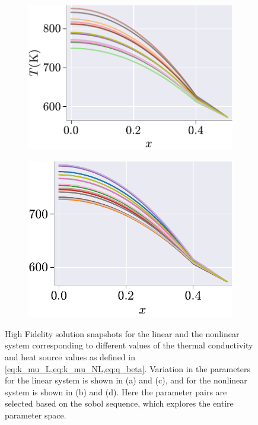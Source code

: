 \documentclass[11pt]{article}
\begin{document}
\begin{figure}[t]
        \begin{subfigure}[b]{0.45\linewidth}
            \centering
            \includegraphics[width=\linewidth]{linear_T_FOM.pdf}
            \caption{}
            \label{fig:HFS_HC_c}
        \end{subfigure}
        \begin{subfigure}[b]{0.45\linewidth}
            \centering
            \includegraphics[width=0.92\linewidth]{nonlinear_T_FOM.pdf}
            \caption{}
            \label{fig:HFS_HC_d}
        \end{subfigure}
        \caption{High Fidelity solution snapshots for the linear and the nonlinear system corresponding to different values of the thermal conductivity and heat source values as defined in \cref{eq:k_mu_L,eq:k_mu_NL,eq:q_beta}.
        Variation in the parameters for the linear system is shown in (a) and (c), and for the nonlinear system is shown in (b) and (d).
        Here the parameter pairs are selected based on the sobol sequence, which explores the entire parameter space.}
        \label{fig:HFS_HC}
    \end{figure}
\end{document}
